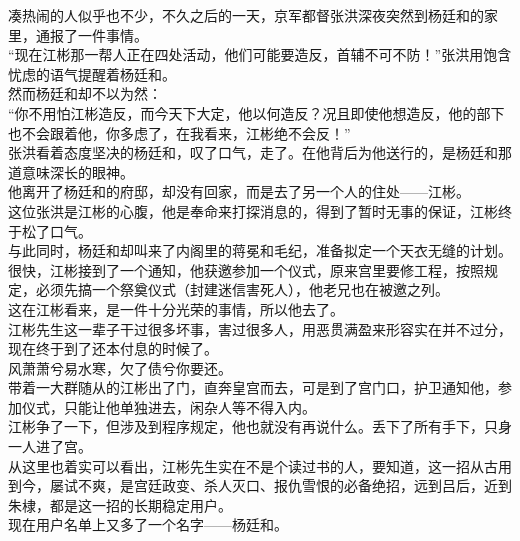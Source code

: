 \begin{multicols}{\theparacolNo}
凑热闹的人似乎也不少，不久之后的一天，京军都督张洪深夜突然到杨廷和的家里，通报了一件事情。\\

“现在江彬那一帮人正在四处活动，他们可能要造反，首辅不可不防！”张洪用饱含忧虑的语气提醒着杨廷和。\\

然而杨廷和却不以为然：\\

“你不用怕江彬造反，而今天下大定，他以何造反？况且即使他想造反，他的部下也不会跟着他，你多虑了，在我看来，江彬绝不会反！”\\

张洪看着态度坚决的杨廷和，叹了口气，走了。在他背后为他送行的，是杨廷和那道意味深长的眼神。\\

他离开了杨廷和的府邸，却没有回家，而是去了另一个人的住处——江彬。\\

这位张洪是江彬的心腹，他是奉命来打探消息的，得到了暂时无事的保证，江彬终于松了口气。\\

与此同时，杨廷和却叫来了内阁里的蒋冕和毛纪，准备拟定一个天衣无缝的计划。\\

很快，江彬接到了一个通知，他获邀参加一个仪式，原来宫里要修工程，按照规定，必须先搞一个祭奠仪式（封建迷信害死人），他老兄也在被邀之列。\\

这在江彬看来，是一件十分光荣的事情，所以他去了。\\

江彬先生这一辈子干过很多坏事，害过很多人，用恶贯满盈来形容实在并不过分，现在终于到了还本付息的时候了。\\

风萧萧兮易水寒，欠了债兮你要还。\\

带着一大群随从的江彬出了门，直奔皇宫而去，可是到了宫门口，护卫通知他，参加仪式，只能让他单独进去，闲杂人等不得入内。\\

江彬争了一下，但涉及到程序规定，他也就没有再说什么。丢下了所有手下，只身一人进了宫。\\

从这里也着实可以看出，江彬先生实在不是个读过书的人，要知道，这一招从古用到今，屡试不爽，是宫廷政变、杀人灭口、报仇雪恨的必备绝招，远到吕后，近到朱棣，都是这一招的长期稳定用户。\\

现在用户名单上又多了一个名字——杨廷和。\\


\end{multicols}
